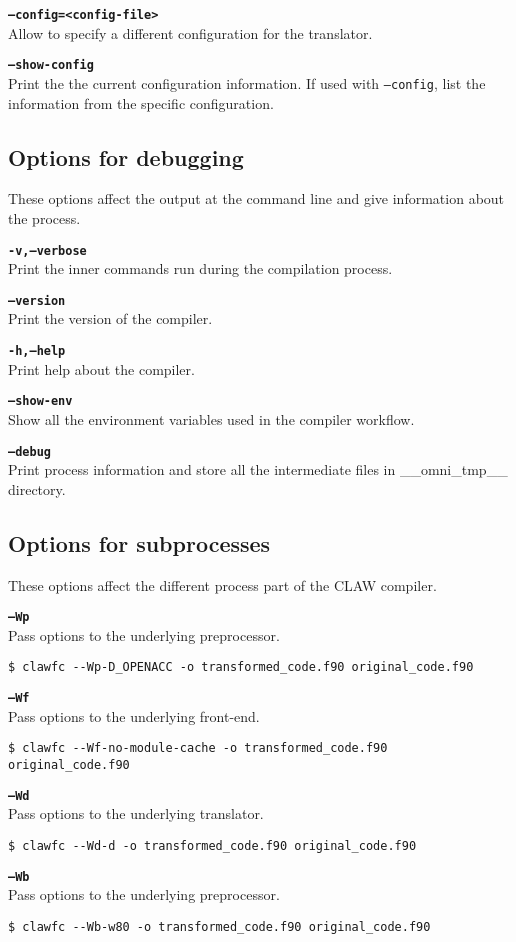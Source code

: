 \documentclass{article}
\begin{document}
\textbf{\texttt{--config=<config-file>}}\\
Allow to specify a different configuration for the translator.

\textbf{\texttt{--show-config}}\\
Print the the current configuration information. If used with \texttt{--config}, list the information from the specific configuration.

\subsection{Options for debugging}
These options affect the output at the command line and give information about the process. 

\textbf{\texttt{-v,--verbose}}\\
Print the inner commands run during the compilation process. 

\textbf{\texttt{--version}}\\
Print the version of the compiler. 

\textbf{\texttt{-h,--help}}\\
Print help about the compiler. 

\textbf{\texttt{--show-env}}\\
Show all the environment variables used in the compiler workflow. 

\textbf{\texttt{--debug}}\\
Print process information and store all the intermediate files in \_\_omni\_tmp\_\_ directory. 

\subsection{Options for subprocesses}
These options affect the different process part of the CLAW compiler. 

\textbf{\texttt{--Wp}}\\
Pass options to the underlying preprocessor. 
\begin{lstlisting}
$ clawfc --Wp-D_OPENACC -o transformed_code.f90 original_code.f90
\end{lstlisting}

\textbf{\texttt{--Wf}}\\
Pass options to the underlying front-end. 
\begin{lstlisting}
$ clawfc --Wf-no-module-cache -o transformed_code.f90 original_code.f90
\end{lstlisting}

\textbf{\texttt{--Wd}}\\
Pass options to the underlying translator. 
\begin{lstlisting}
$ clawfc --Wd-d -o transformed_code.f90 original_code.f90
\end{lstlisting}

\textbf{\texttt{--Wb}}\\
Pass options to the underlying preprocessor. 
\begin{lstlisting}
$ clawfc --Wb-w80 -o transformed_code.f90 original_code.f90
\end{lstlisting}
\end{document}
